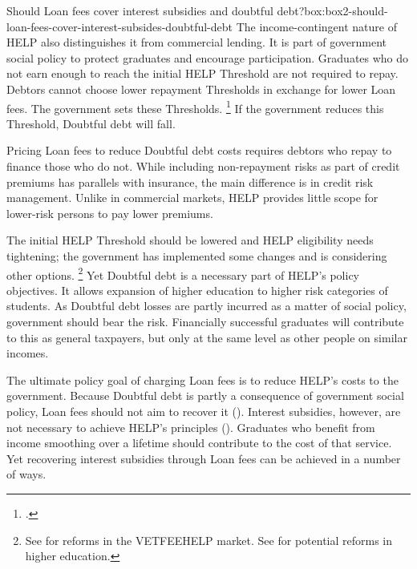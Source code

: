 \documentclass[embargoed]{grattan}
\begin{document}
\begin{bigbox*}{Should \gls{Loan fees} cover interest subsidies and doubtful debt?}{box:box2-should-loan-fees-cover-interest-subsides-doubtful-debt}
The income-contingent nature of \gls{HELP} also distinguishes it from commercial lending.
It is part of government social policy to protect graduates and encourage participation.
Graduates who do not earn enough to reach the initial \gls{HELP} \gls{Threshold} are not required to repay.
Debtors cannot choose lower repayment \gls{Threshold}s in exchange for lower \gls{Loan fees}.
The government sets these \gls{Threshold}s.%
\footnote{\textcite[][Figure~16]{Norton2014Doubtfuldebtrising}.} 
If the government reduces this \gls{Threshold}, \gls{Doubtful debt} will fall.

Pricing \gls{Loan fees} to reduce \gls{Doubtful debt} costs requires debtors who repay to finance those who do not.
While including non-repayment risks as part of credit premiums has parallels with insurance, the main difference is in credit risk management.
Unlike in commercial markets, \gls{HELP} provides little scope for lower-risk persons to pay lower premiums.

The initial \gls{HELP} \gls{Threshold} should be lowered and \gls{HELP} eligibility needs tightening; the government has implemented some changes and is considering other options.%
\footnote{See \textcites{Ryan2016RedesigningVETFEE}{Birmingham2016MediareleaseNew} for reforms in the \gls{VETFEEHELP} market. See \textcite{Education2016DrivingInnovationFairness} for potential reforms in higher education.} 
Yet \gls{Doubtful debt} is a necessary part of \gls{HELP}'s policy objectives.
It allows expansion of higher education to higher risk categories of students.
As \gls{Doubtful debt} losses are partly incurred as a matter of social policy, government should bear the risk.
Financially successful graduates will contribute to this as general taxpayers, but only at the same level as other people on similar incomes.
\end{bigbox*}

The ultimate policy goal of charging \gls{Loan fees} is to reduce \gls{HELP}'s costs to the government.
Because \gls{Doubtful debt} is partly a consequence of government social policy, \gls{Loan fees} should not aim to recover it ().
Interest subsidies, however, are not necessary to achieve \gls{HELP}'s principles ().
Graduates who benefit from income smoothing over a lifetime should contribute to the cost of that service.
Yet recovering interest subsidies through \gls{Loan fees} can be achieved in a number of ways.
\end{document}

